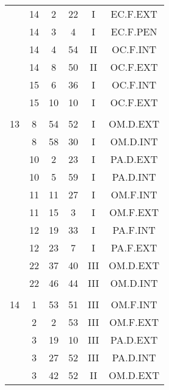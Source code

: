 \documentclass[12pt, a4paper]{article}
\begin{document}
\begin{multicols}{3}
{\begin{tabular}{c c c c c c}
	 	 	 	 & 14 & 2 & 22 & I & EC.F.EXT\\%
	 	 	 	 & 14 & 3 & 4 & I & EC.F.PEN\\%
	 	 	 	 & 14 & 4 & 54 & II & OC.F.INT\\%
	 	 	 	 & 14 & 8 & 50 & II & OC.F.EXT\\%
	 	 	 	 & 15 & 6 & 36 & I & OC.F.INT\\%
	 	 	 	 & 15 & 10 & 10 & I & OC.F.EXT\\%
	 	 	 	 & & & & & \\%
	 	 	 	13 & 8 & 54 & 52 & I & OM.D.EXT\\%
	 	 	 	 & 8 & 58 & 30 & I & OM.D.INT\\%
	 	 	 	 & 10 & 2 & 23 & I & PA.D.EXT\\%
	 	 	 	 & 10 & 5 & 59 & I & PA.D.INT\\%
	 	 	 	 & 11 & 11 & 27 & I & OM.F.INT\\%
	 	 	 	 & 11 & 15 & 3 & I & OM.F.EXT\\%
	 	 	 	 & 12 & 19 & 33 & I & PA.F.INT\\%
	 	 	 	 & 12 & 23 & 7 & I & PA.F.EXT\\%
	 	 	 	 & 22 & 37 & 40 & III & OM.D.EXT\\%
	 	 	 	 & 22 & 46 & 44 & III & OM.D.INT\\%
	 	 	 	 & & & & & \\%
	 	 	 	14 & 1 & 53 & 51 & III & OM.F.INT\\%
	 	 	 	 & 2 & 2 & 53 & III & OM.F.EXT\\%
	 	 	 	 & 3 & 19 & 10 & III & PA.D.EXT\\%
	 	 	 	 & 3 & 27 & 52 & III & PA.D.INT\\%
	 	 	 	 & 3 & 42 & 52 & II & OM.D.EXT\\%

\end{tabular}}
\end{multicols}
\end{document}
